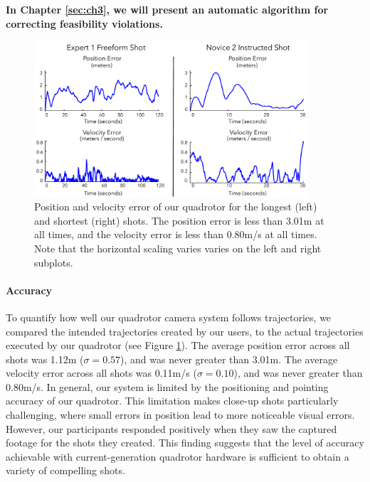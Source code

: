 \begin{tcolorbox}[before skip=20pt, after skip=20pt, sharp corners]
\begin{center}
\textbf{In Chapter \ref{sec:ch3}, we will present an automatic algorithm for correcting feasibility violations.}
\end{center}
\end{tcolorbox}

\begin{figure}[t]
\centering
\includegraphics[width=4.0in]{images/2015_siggraph_asia/errors.pdf}
\caption{
Position and velocity error of our quadrotor for the longest (left) and shortest (right) shots.
The position error is less than 3.01m at all times, and the velocity error is less than 0.80m/s at all times.
Note that the horizontal scaling varies varies on the left and right subplots. 
}
\label{fig:ch2:errors}
\end{figure}

\paragraph{Accuracy}
To quantify how well our quadrotor camera system follows trajectories, we compared the intended trajectories created by our users, to the actual trajectories executed by our quadrotor (see Figure \ref{fig:ch2:errors}).
The average position error across all shots was 1.12m ($\sigma = 0.57$), and was never greater than 3.01m.
The average velocity error across all shots was 0.11m/s ($\sigma = 0.10$), and was never greater than 0.80m/s.
In general, our system is limited by the positioning and pointing accuracy of our quadrotor.
This limitation makes close-up shots particularly challenging, where small errors in position lead to more noticeable visual errors.
However, our participants responded positively when they saw the captured footage for the shots they created.
This finding suggests that the level of accuracy achievable with current-generation quadrotor hardware is sufficient to obtain a variety of compelling shots.


